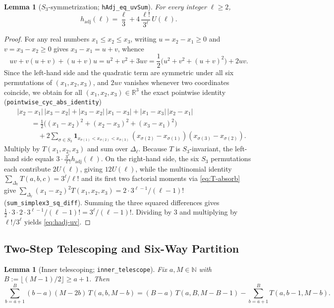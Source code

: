 \documentclass[11pt,a4paper]{article}
\numberwithin{equation}{section}
\theoremstyle{plain}
\newtheorem{lemma}[theorem]{Lemma}
\theoremstyle{definition}
\theoremstyle{remark}
\newcommand{\N}{\mathbb{N}}
\newcommand{\R}{\mathbb{R}}
\newcommand{\hadj}{h_{\mathrm{adj}}}
\newcommand{\code}[1]{\texttt{\small #1}}
\begin{document}
\begin{lemma}[$S_3$-symmetrization; \code{hAdj\_eq\_uvSum}]
\label{lem:symm}
For every integer $\ell\ge 2$,
\begin{equation}\label{eq:hadj-uv}
  \hadj(\ell) = \frac{\ell}{3} + 4\,\frac{\ell!}{3^\ell}\,U(\ell).
\end{equation}
\end{lemma}

\begin{proof}
For any real numbers $x_1\le x_2\le x_3$, writing $u=x_2-x_1\ge 0$ and $v=x_3-x_2\ge 0$ gives $x_3-x_1=u+v$, whence
\[
  uv + v(u+v) + (u+v)u = u^2+v^2+3uv = \frac{1}{2}\bigl(u^2+v^2+(u+v)^2\bigr) + 2uv.
\]
Since the left-hand side and the quadratic term are symmetric under all six permutations of $(x_1,x_2,x_3)$, and $2uv$ vanishes whenever two coordinates coincide, we obtain for all $(x_1,x_2,x_3)\in\R^3$ the exact pointwise identity (\code{pointwise\_cyc\_abs\_identity})
\begin{align*}
  &|x_2-x_1|\,|x_3-x_2| + |x_3-x_2|\,|x_1-x_3| + |x_1-x_3|\,|x_2-x_1|\\
  &\qquad = \frac{1}{2}\bigl((x_1-x_2)^2+(x_2-x_3)^2+(x_3-x_1)^2\bigr)\\
  &\qquad\quad + 2\sum_{\sigma\in S_3} \mathbf{1}_{x_{\sigma(1)}<x_{\sigma(2)}<x_{\sigma(3)}}\,(x_{\sigma(2)}-x_{\sigma(1)})(x_{\sigma(3)}-x_{\sigma(2)}).
\end{align*}
Multiply by $T(x_1,x_2,x_3)$ and sum over $\Delta_\ell$. Because $T$ is $S_3$-invariant, the left-hand side equals $3\cdot \frac{3^\ell}{\ell!}\hadj(\ell)$. On the right-hand side, the six $S_3$ permutations each contribute $2U(\ell)$, giving $12U(\ell)$, while the multinomial identity $\sum_{\Delta_\ell}T(a,b,c)=3^\ell/\ell!$ and its first two factorial moments via \eqref{eq:T-absorb} give $\sum_{\Delta_\ell}(x_1-x_2)^2 T(x_1,x_2,x_3)=2\cdot 3^{\ell-1}/(\ell-1)!$ (\code{sum\_simplex3\_sq\_diff}). Summing the three squared differences gives $\frac{1}{2}\cdot 3\cdot 2\cdot 3^{\ell-1}/(\ell-1)!=3^\ell/(\ell-1)!$. Dividing by $3$ and multiplying by $\ell!/3^\ell$ yields \eqref{eq:hadj-uv}.
\end{proof}

\subsection{Two-Step Telescoping and Six-Way Partition}

\begin{lemma}[Inner telescoping; \code{inner\_telescope}]
\label{lem:inner-tel}
Fix $a,M\in\N$ with $B:=\lfloor(M-1)/2\rfloor \ge a+1$. Then
\begin{equation}\label{eq:inner-tel}
  \sum_{b=a+1}^{B} (b-a)(M-2b)\,T(a,b,M-b)
  = (B-a)\,T(a,B,M-B-1) - \sum_{b=a+1}^{B} T(a,b-1,M-b).
\end{equation}
\end{lemma}
\end{document}

